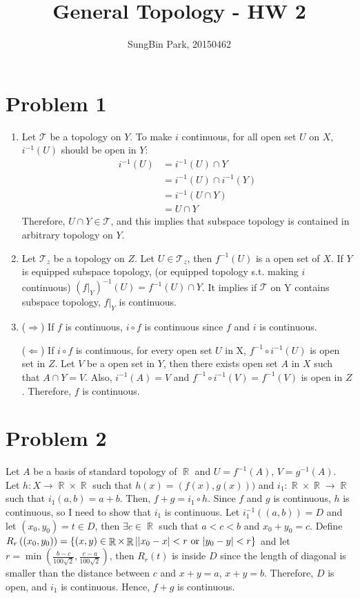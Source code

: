 \documentclass{article}
\DeclareMathOperator{\rr}{\mathbb{R}}
\DeclarePairedDelimiter\abs{\lvert}{\rvert}%
\newcommand{\T}{\mathcal{T}}
\begin{document}
\title{General Topology - HW 2}
\author{SungBin Park, 20150462} 

 \maketitle
\section*{Problem 1}
\begin{enumerate}
\item Let $\T$ be a topology on $Y$. To make $i$ continuous, for all open set $U$ on $X$, $i^{-1}(U)$ should be open in $Y$:
\begin{equation*}
\begin{split}
i^{-1}(U)&=i^{-1}(U)\cap Y\\
&=i^{-1}(U)\cap i^{-1}(Y)\\
&=i^{-1}(U\cap Y)\\
&=U\cap Y
\end{split}
\end{equation*}
Therefore, $U\cap Y\in \T$, and this implies that subspace topology is contained in arbitrary topology on $Y$.
\item Let $\T_z$ be a topology on $Z$. Let $U\in \T_z$, then $f^{-1}(U)$ is a open set of $X$. If $Y$ is equipped subspace topology, (or equipped topology s.t. making $i$ continuous) $\left(f|_Y\right)^{-1}(U)=f^{-1}(U)\cap Y$. It implies if $\T$ on Y contains subspace topology, $f|_Y$ is continuous.
\item ($\Rightarrow$) If $f$ is continuous, $i\circ f$ is continuous since $f$ and $i$ is continuous.

($\Leftarrow$) If $i\circ f$ is continuous, for every open set $U$ in X, $f^{-1}\circ i^{-1}(U)$ is open set in $Z$. Let $V$ be a open set in $Y$, then there exists open set $A$ in $X$ such that $A \cap Y=V$. Also, $i^{-1}(A)=V$ and $f^{-1}\circ i^{-1}(V)=f^{-1}(V)$ is open in $Z$. Therefore, $f$ is continuous.
\end{enumerate}
\section*{Problem 2}
Let $A$ be a basis of standard topology of $\rr$ and $U=f^{-1}(A)$, $V=g^{-1}(A)$. Let $h:X\rightarrow\rr\times \rr$ such that $h(x)=(f(x), g(x)))$ and  $i_1:\rr\times\rr\rightarrow\rr$ such that $i_1(a,b)=a+b$. Then, $f+g=i_1\circ h$. Since $f$ and $g$ is continuous, $h$ is continuous, so I need to show that $i_1$ is continuous. Let $i_1^{-1}\left((a,b)\right)=D$ and let $(x_0,y_0)=t\in D$, then $\exists c\in \rr$ such that $a<c<b$ and $x_0+y_0=c$. Define $R_r\left((x_0,y_0)\right)=\{(x,y)\in \rr\times \rr|\abs{x_0-x}<r \text{ or }\abs{y_0-y}<r\}$ and let $r=\min(\frac{b-c}{100\sqrt{2}},\frac{c-a}{100\sqrt{2}})$, then $R_r(t)$ is inside $D$ since the length of diagonal is smaller than the distance between $c$ and $x+y=a$, $x+y=b$. Therefore, $D$ is open, and $i_1$ is continuous. Hence, $f+g$ is continuous.
\end{document}
